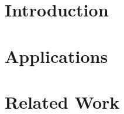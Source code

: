\documentclass[11pt,oneside]{book}
\begin{document}


\clearpage
\newpage

\chapter*{Introduction}


\chapter*{Applications}



\chapter*{Related Work}


\newpage
{}

\renewcommand\bibname{References}

\end{document}
